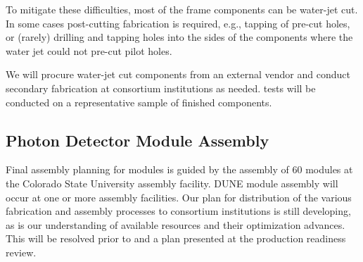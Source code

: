 To mitigate these difficulties, most of the  frame components %
can be water-jet cut. %
In some cases post-cutting fabrication is required, e.g., tapping of pre-cut holes, or (rarely) drilling and tapping holes into the sides of the components where the water jet could not pre-cut pilot holes.

We will procure water-jet cut components from an external vendor and conduct secondary fabrication at consortium institutions as needed.   tests will be conducted on a representative sample of finished components.

\label{sec:fdsp-pd-prod-pc}



\subsection{Photon Detector Module Assembly}

Final assembly planning for  modules is guided by the assembly of \num{60}   modules at the Colorado State University assembly facility. DUNE   module assembly will occur at one or more assembly facilities.  Our plan for distribution of the various fabrication and assembly processes to consortium institutions is still developing, as is our understanding of available resources and their optimization advances.  This will be resolved prior to and a plan presented at the production readiness review.

